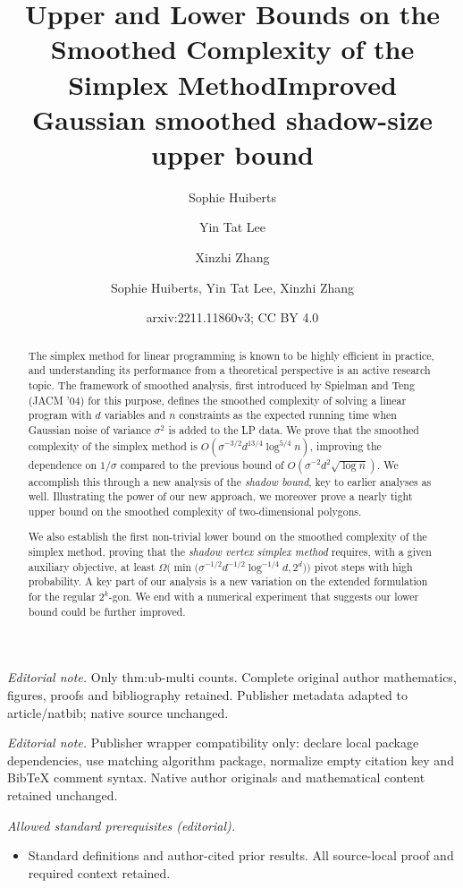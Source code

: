 \documentclass{article}\usepackage[a4paper,margin=20mm]{geometry}
\title{Upper and Lower Bounds on the Smoothed Complexity of the Simplex Method}
\author{Sophie Huiberts \and Yin Tat Lee \and Xinzhi Zhang}\date{}
\title{Improved Gaussian smoothed shadow-size upper bound}
\author{Sophie Huiberts, Yin Tat Lee, Xinzhi Zhang}
\date{arxiv:2211.11860v3; CC BY 4.0}
\begin{document}
\maketitle
\noindent\textit{Editorial note.} Only thm:ub-multi counts. Complete original author mathematics, figures, proofs and bibliography retained. Publisher metadata adapted to article/natbib; native source unchanged.\par\medskip
\noindent\textit{Editorial note.} Publisher wrapper compatibility only: declare local package dependencies, use matching algorithm package, normalize empty citation key and BibTeX comment syntax. Native author originals and mathematical content retained unchanged.\par\medskip
\noindent\textit{Allowed standard prerequisites (editorial).}\begin{itemize}
\item Standard definitions and author-cited prior results. All source-local proof and required context retained.
\end{itemize}\medskip

\maketitle

\begin{abstract}
The simplex method for linear programming is known to be highly efficient in practice,
and understanding its performance from a theoretical perspective is an active research topic.
The framework of smoothed analysis, first introduced by Spielman and Teng (JACM '04)
for this purpose, defines the smoothed complexity of solving a linear program
with $d$ variables and $n$ constraints as the expected running time when
Gaussian noise of variance $\sigma^2$ is added to the LP data.
We prove that the smoothed complexity of the simplex method is
$O(\sigma^{-3/2} d^{13/4}\log^{5/4} n)$,
improving the dependence on $1/\sigma$ compared to the previous bound of
$O(\sigma^{-2} d^2\sqrt{\log n})$.
We accomplish this through a new analysis of the \emph{shadow bound},
key to earlier analyses as well.
Illustrating the power of our new approach, we moreover prove a
nearly tight upper bound on the smoothed complexity of two-dimensional
polygons.

We also establish the first non-trivial lower bound on the smoothed complexity
of the simplex method, proving that the \emph{shadow vertex simplex method}
requires, with a given auxiliary objective, at least
$\Omega \Big(\min \big(\sigma^{-1/2} d^{-1/2}\log^{-1/4} d,2^d \big) \Big)$
pivot steps with high probability. A key part of our analysis
is a new variation on the extended formulation for the regular $2^k$-gon.
We end with a numerical experiment that suggests our lower bound could
be further improved.
\end{abstract}
\end{document}
